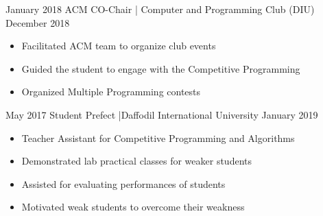 %
%
%


\begin{experiences}
  \mentoring
    {January 2018}   {ACM CO-Chair | Computer and Programming Club (DIU)}
    {December 2018} {
                      \begin{itemize}
                        \item Facilitated ACM team to organize club events
                        \item Guided the student to engage with the Competitive Programming
                        \item Organized Multiple Programming contests
                      \end{itemize}
                    }
  \emptySeparator
  \mentoring
    {May 2017}   {Student Prefect |Daffodil International University}
    {January 2019} {
                      \begin{itemize}
                        \item Teacher Assistant for Competitive Programming and Algorithms  
                        \item Demonstrated lab practical classes for weaker students
                        \item Assisted for evaluating performances of students
                        \item Motivated weak students to overcome their weakness
                      \end{itemize}
                    }
\end{experiences}